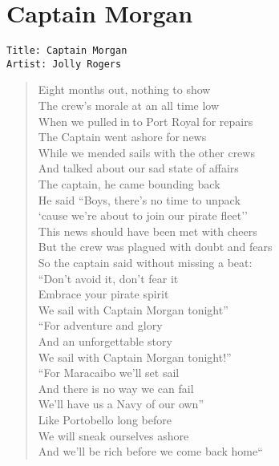 \documentclass[11pt]{article}
\begin{document}
\section{Captain Morgan}
\label{sec:org5d3ea46}
\begin{verbatim}
Title: Captain Morgan
Artist: Jolly Rogers
\end{verbatim}
\begin{verse}
Eight months out, nothing to show\\
The crew's morale at an all time low\\
When we pulled in to Port Royal for repairs\\
The Captain went ashore for news\\
While we mended sails with the other crews\\
And talked about our sad state of affairs\\
\vspace*{1em}
The captain, he came bounding back\\
He said ``Boys, there's no time to unpack\\
`cause we're about to join our pirate fleet''\\
This news should have been met with cheers\\
But the crew was plagued with doubt and fears\\
So the captain said without missing a beat:\\
\vspace*{1em}
``Don't avoid it, don't fear it\\
Embrace your pirate spirit\\
We sail with Captain Morgan tonight''\\
\vspace*{1em}
``For adventure and glory\\
And an unforgettable story\\
We sail with Captain Morgan tonight!''\\
\vspace*{1em}
``For Maracaibo we'll set sail\\
And there is no way we can fail\\
We'll have us a Navy of our own''\\
\vspace*{1em}
Like Portobello long before\\
We will sneak ourselves ashore\\
And we'll be rich before we come back home``\\
\vspace*{1em}

\end{verse}
\end{document}

